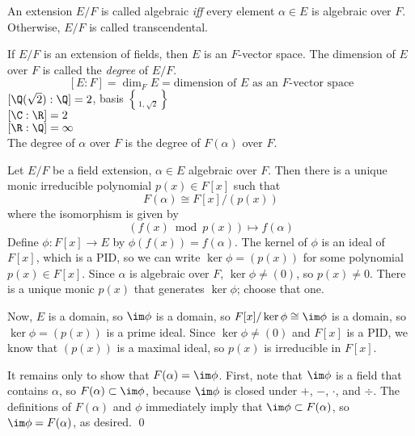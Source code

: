 An extension $E/F$ is called algebraic \emph{iff} every element $\alpha\in E$ is algebraic over $F$.  Otherwise, $E/F$ is called transcendental.

If $E/F$ is an extension of fields, then $E$ is an $F$-vector space.  The dimension of $E$ over $F$ is called the \emph{degree} of $E/F$.
\[ [E:F] = \dim_F E = \text{dimension of $E$ as an $F$-vector space} \]
\eg $[\Q(\sqrt2):\Q]=2$, basis $\brace{1,\sqrt2}$ \\
$[\C:\R]=2$ \\
$[\R:\Q]=\infty$ \\
The degree of $\alpha$ over $F$ is the degree of $F(\alpha)$ over $F$.

\thm Let $E/F$ be a field extension, $\alpha\in E$ algebraic over $F$.  Then there is a unique monic irreducible polynomial $p(x)\in F[x]$ such that
\[ F(\alpha) \cong F[x] / (p(x)) \]
where the isomorphism is given by
\[ (f(x)\bmod p(x)) \mapsto f(\alpha) \]
\pf Define $\phi\colon F[x]\to E$ by $\phi(f(x))=f(\alpha)$.  The kernel of $\phi$ is an ideal of $F[x]$, which is a PID, so we can write $\ker\phi=(p(x))$ for some polynomial $p(x)\in F[x]$.  Since $\alpha$ is algebraic over $F$, $\ker\phi\neq(0)$, so $p(x)\neq0$.  There is a unique monic $p(x)$ that generates $\ker\phi$; choose that one.

Now, $E$ is a domain, so $\im\phi$ is a domain, so $F[x]/\ker\phi\cong\im\phi$ is a domain, so $\ker\phi=(p(x))$ is a prime ideal.  Since $\ker\phi\neq(0)$ and $F[x]$ is a PID, we know that $(p(x))$ is a maximal ideal, so $p(x)$ is irreducible in $F[x]$.

It remains only to show that $F(\alpha)=\im\phi$.  First, note that $\im\phi$ is a field that contains $\alpha$, so $F(\alpha)\subset\im\phi$, because $\im\phi$ is closed under $+$, $-$, $\cdot$, and $\div$.  The definitions of $F(\alpha)$ and $\phi$ immediately imply that $\im\phi\subset F(\alpha)$, so $\im\phi=F(\alpha)$, as desired. \qed
